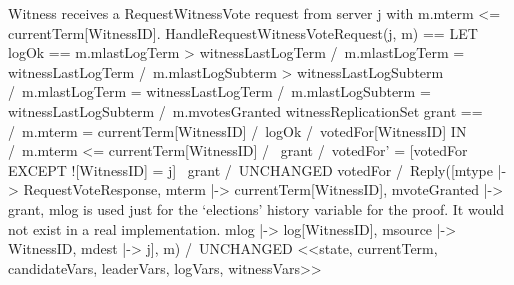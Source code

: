 \documentclass[preview, border={5pt 0pt 5pt 1pt}]{standalone}
\begin{document}
\onehalfspacing

    \begin{tla}

\* Witness receives a RequestWitnessVote request from server j with
\* m.mterm <= currentTerm[WitnessID].
HandleRequestWitnessVoteRequest(j, m) ==
    LET logOk == \/ m.mlastLogTerm > witnessLastLogTerm
                 \/ /\ m.mlastLogTerm = witnessLastLogTerm
                    /\ m.mlastLogSubterm > witnessLastLogSubterm
                 \/ /\ m.mlastLogTerm = witnessLastLogTerm
                    /\ m.mlastLogSubterm = witnessLastLogSubterm
                    /\ m.mvotesGranted \subseteq witnessReplicationSet
        grant == /\ m.mterm = currentTerm[WitnessID]
                 /\ logOk
                 /\ votedFor[WitnessID] 
    IN /\ m.mterm <= currentTerm[WitnessID]
       /\ \/ grant  /\ votedFor' = [votedFor EXCEPT ![WitnessID] = j]
          \/ ~grant /\ UNCHANGED votedFor
       /\ Reply([mtype        |-> RequestVoteResponse,
                 mterm        |-> currentTerm[WitnessID],
                 mvoteGranted |-> grant,
                 \* mlog is used just for the `elections' history variable for
                 \* the proof. It would not exist in a real implementation.
                 mlog         |-> log[WitnessID],
                 msource      |-> WitnessID,
                 mdest        |-> j],
                 m)
       /\ UNCHANGED <<state, currentTerm, candidateVars, leaderVars, 
                      logVars, witnessVars>>
    \end{tla}
\end{document}
